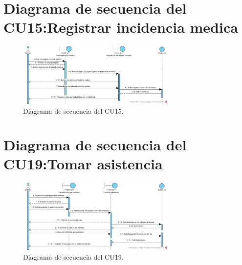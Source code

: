 \newpage
\section{Diagrama de secuencia del CU15:Registrar incidencia medica}

\begin{figure}[htbp]
\centering
\includegraphics[width=0.7\textwidth]{images/diagramasecuencia15}
\caption{Diagrama de secuencia del CU15.}
\label{fig:diagramasecuencia15}
\end{figure}

\section{Diagrama de secuencia del CU19:Tomar asistencia}

\begin{figure}[htbp]
\centering
\includegraphics[width=0.7\textwidth]{images/diagramasecuencia19}
\caption{Diagrama de secuencia del CU19.}
\label{fig:diagramasecuencia19}
\end{figure}